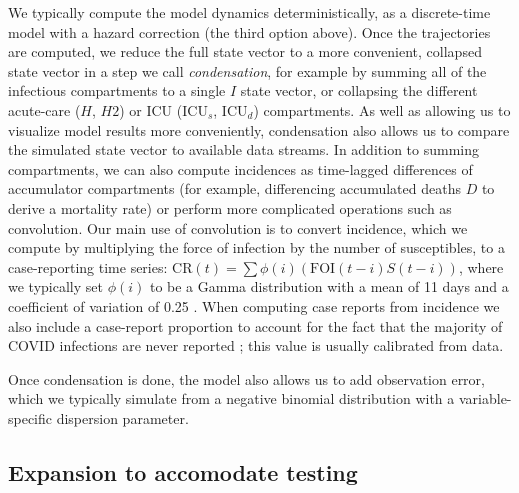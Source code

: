 \documentclass[12pt]{article}\usepackage[]{graphicx}\usepackage[]{color}
\begin{document}
We typically compute the model dynamics deterministically, as a discrete-time model with a hazard correction (the third option above).  Once the trajectories are computed, we reduce the full state vector to a more convenient, collapsed state vector in a step we call \emph{condensation}, for example by summing all of the infectious compartments to a single $I$ state vector, or collapsing the different acute-care ($H$, $H2$) or ICU ($\textrm{ICU}_s$, $\textrm{ICU}_d$) compartments.
As well as allowing us to visualize model results more conveniently, condensation also allows us to compare the simulated state vector to available data streams.
In addition to summing compartments, we can also compute incidences as time-lagged differences of accumulator compartments (for example, differencing accumulated deaths $D$ to derive a mortality rate) or perform more complicated operations such as convolution. 
Our main use of convolution is to convert incidence, which we compute by multiplying the force of infection by the number of susceptibles, to a case-reporting time series: $\textrm{CR}(t) = \sum \phi(i) (\textrm{FOI}(t-i) S(t-i))$, where we typically set $\phi(i)$ to be a Gamma distribution with a mean of 11 days and a coefficient of variation of 0.25 .
 When computing case reports from incidence we also include a case-report proportion  to account for the fact that the majority of COVID infections are never reported \cite{Doug+2020}; this value is usually calibrated from data.

Once condensation is done, the model also allows us to add observation error, which we typically simulate from a negative binomial distribution with a variable-specific dispersion parameter.

\subsection*{Expansion to accomodate testing}
\end{document}
